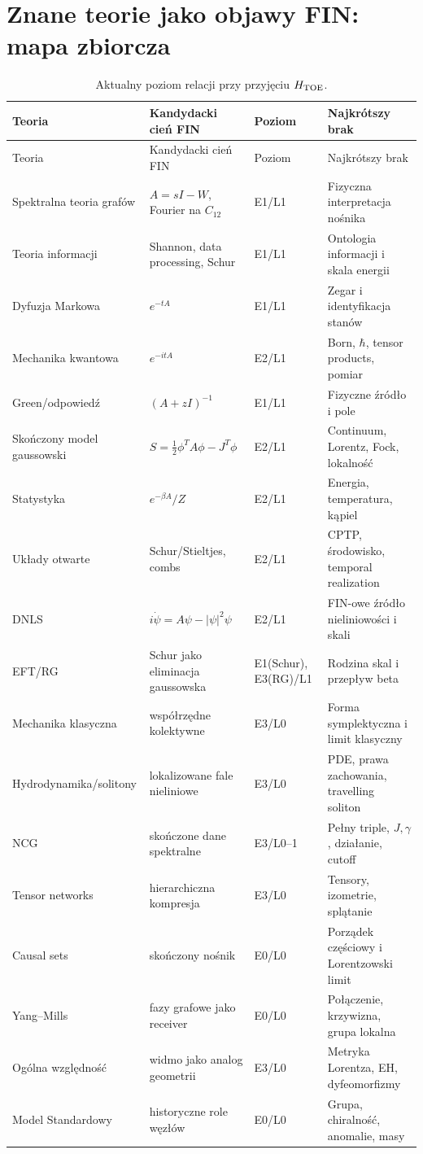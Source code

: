 \documentclass[11pt,a4paper]{article}
\begin{document}
\section{Znane teorie jako objawy FIN: mapa zbiorcza}

\small
\begin{longtable}{@{}p{}p{}p{}p{}@{}}
\caption{Aktualny poziom relacji przy przyjęciu $H_{\rm TOE}$.}\\
\toprule
Teoria & Kandydacki cień FIN & Poziom & Najkrótszy brak\\
\midrule
\endfirsthead
\toprule
Teoria & Kandydacki cień FIN & Poziom & Najkrótszy brak\\
\midrule
\endhead
Spektralna teoria grafów & $A=sI-W$, Fourier na $C_{12}$ & E1/L1 & Fizyczna interpretacja nośnika\\
Teoria informacji & Shannon, data processing, Schur & E1/L1 & Ontologia informacji i skala energii\\
Dyfuzja Markowa & $e^{-tA}$ & E1/L1 & Zegar i identyfikacja stanów\\
Mechanika kwantowa & $e^{-itA}$ & E2/L1 & Born, $\hbar$, tensor products, pomiar\\
Green/odpowiedź & $(A+zI)^{-1}$ & E1/L1 & Fizyczne źródło i pole\\
Skończony model gaussowski & $S=\frac12\phi^TA\phi-J^T\phi$ & E2/L1 & Continuum, Lorentz, Fock, lokalność\\
Statystyka & $e^{-\beta A}/Z$ & E2/L1 & Energia, temperatura, kąpiel\\
Układy otwarte & Schur/Stieltjes, combs & E2/L1 & CPTP, środowisko, temporal realization\\
DNLS & $i\dot\psi=A\psi-|\psi|^2\psi$ & E2/L1 & FIN-owe źródło nieliniowości i skali\\
EFT/RG & Schur jako eliminacja gaussowska & E1(Schur), E3(RG)/L1 & Rodzina skal i przepływ beta\\
Mechanika klasyczna & współrzędne kolektywne & E3/L0 & Forma symplektyczna i limit klasyczny\\
Hydrodynamika/\newline solitony & lokalizowane fale nieliniowe & E3/L0 & PDE, prawa zachowania, travelling soliton\\
NCG & skończone dane spektralne & E3/L0--1 & Pełny triple, $J,\gamma$, działanie, cutoff\\
Tensor networks & hierarchiczna kompresja & E3/L0 & Tensory, izometrie, splątanie\\
Causal sets & skończony nośnik & E0/L0 & Porządek częściowy i Lorentzowski limit\\
Yang--Mills & fazy grafowe jako receiver & E0/L0 & Połączenie, krzywizna, grupa lokalna\\
Ogólna względność & widmo jako analog geometrii & E3/L0 & Metryka Lorentza, EH, dyfeomorfizmy\\
Model Standardowy & historyczne role węzłów & E0/L0 & Grupa, chiralność, anomalie, masy\\
\bottomrule
\end{longtable}
\normalsize
\end{document}
